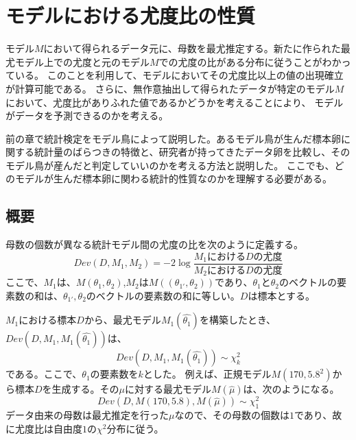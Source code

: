 \chapter{モデルにおける尤度比の性質}
モデル$M$において得られるデータ元に、母数を最尤推定する。新たに作られた最尤モデル上での尤度と元のモデル$M$での尤度の比がある分布に従うことがわかっている。
このことを利用して、モデルにおいてその尤度比以上の値の出現確立が計算可能である。
さらに、無作意抽出して得られたデータが特定のモデル$M$において、尤度比がありふれた値であるかどうかを考えることにより、
モデルがデータを予測できるのかを考える。

前の章で統計検定をモデル鳥によって説明した。あるモデル鳥が生んだ標本卵に関する統計量のばらつきの特徴と、研究者が持ってきたデータ卵を比較し、そのモデル鳥が産んだと判定していいのかを考える方法と説明した。
ここでも、どのモデルが生んだ標本卵に関わる統計的性質なのかを理解する必要がある。



\section{概要}

\begin{defi}
 母数の個数が異なる統計モデル間の尤度の比を次のように定義する。
 \begin{equation*}
  Dev(D,M_1,M_2) = -2\log\frac{M_1におけるDの尤度}{M_2におけるDの尤度}
 \end{equation*}
 ここで、$M_1$は、$M(\theta_1,\theta_2)$,$M_2$は$M((\theta_{1'},\theta_2))$であり、$\theta_1$と$\theta_2$のベクトルの要素数の和は、$\theta_{1'},\theta_2$のベクトルの要素数の和に等しい。$D$は標本とする。
\end{defi}

$M_1$における標本$D$から、最尤モデル$M_1(\hat{\theta_1})$を構築したとき、$Dev(D,M_1,M_1(\hat{\theta_1}))$は、
\begin{equation*}
    Dev(D,M_1,M_1(\hat{\theta_1})) \sim \chi^2_{k}
\end{equation*}
である。ここで、$\theta_1$の要素数を$k$とした。
例えば、正規モデル$M(170,5.8^2)$から標本$D$を生成する。その$\mu$に対する最尤モデル$M(\hat{\mu})$は、次のようになる。
\begin{equation*}
    Dev(D,M(170,5.8),M(\hat{\mu})) \sim \chi^2_1
\end{equation*}
データ由来の母数は最尤推定を行った$\mu$なので、その母数の個数は$1$であり、故に尤度比は自由度$1$の$\chi^2$分布に従う。

